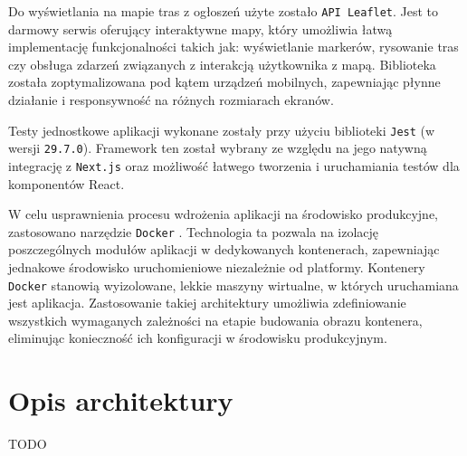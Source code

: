 Do wyświetlania na mapie tras z ogłoszeń użyte zostało \texttt{API Leaflet}. Jest to darmowy serwis oferujący interaktywne mapy, który umożliwia łatwą implementację funkcjonalności takich jak: wyświetlanie markerów, rysowanie tras czy obsługa zdarzeń związanych z interakcją użytkownika z mapą. Biblioteka została zoptymalizowana pod kątem urządzeń mobilnych, zapewniając płynne działanie i responsywność na różnych rozmiarach ekranów.

Testy jednostkowe aplikacji wykonane zostały przy użyciu biblioteki \texttt{Jest} \cite{Jest} (w wersji \texttt{29.7.0}). Framework ten został wybrany ze względu na jego natywną integrację z \texttt{Next.js} oraz możliwość łatwego tworzenia i uruchamiania testów dla komponentów React.

W celu usprawnienia procesu wdrożenia aplikacji na środowisko produkcyjne, zastosowano narzędzie \texttt{Docker} \cite{Docker}. Technologia ta pozwala na izolację poszczególnych modułów aplikacji w dedykowanych kontenerach, zapewniając jednakowe środowisko uruchomieniowe niezależnie od platformy. Kontenery \texttt{Docker} stanowią wyizolowane, lekkie maszyny wirtualne, w których uruchamiana jest aplikacja. Zastosowanie takiej architektury umożliwia zdefiniowanie wszystkich wymaganych zależności na etapie budowania obrazu kontenera, eliminując konieczność ich konfiguracji w środowisku produkcyjnym.

\section{Opis architektury}
TODO
